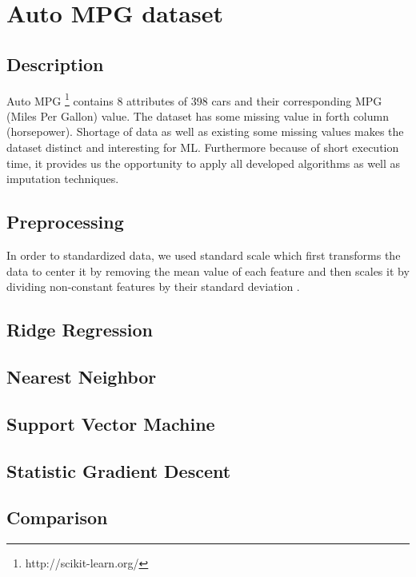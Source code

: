 \section{Auto MPG dataset}
\subsection{Description}
Auto MPG \footnote{http://scikit-learn.org/} contains 8 attributes of 398 cars  and their corresponding MPG (Miles Per Gallon) value. The dataset has some missing value in forth column (horsepower). Shortage of data as well as existing some missing values makes the dataset distinct and interesting for ML. Furthermore because of short execution time, it provides us the opportunity to apply all developed algorithms as well as imputation techniques.

\subsection{Preprocessing}
In order to standardized data, we used standard scale which first transforms the data to center it by removing the mean value of each feature and then scales it by dividing non-constant features by their standard deviation \cite{scikitstandardization}.

\subsection{Ridge Regression}
\subsection{Nearest Neighbor}
\subsection{Support Vector Machine}
\subsection{Statistic Gradient Descent}
\subsection{Comparison}
